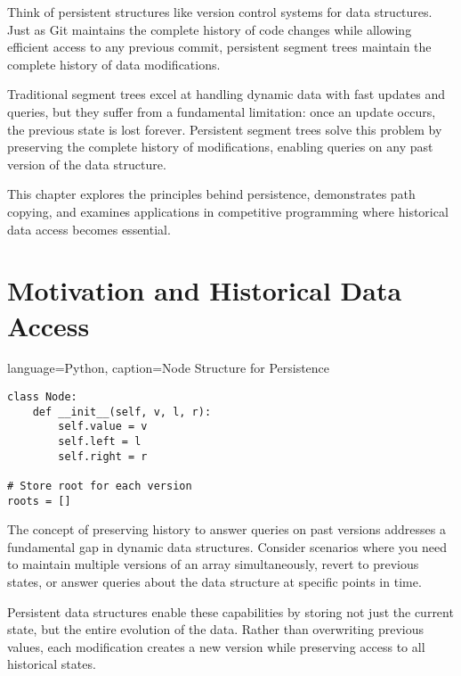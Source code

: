 \label{chap:persistent_segment_trees}

\begin{marginnoteenv}[0pt]{Think of persistent structures like version control systems for data structures. Just as Git maintains the complete history of code changes while allowing efficient access to any previous commit, persistent segment trees maintain the complete history of data modifications.} \end{marginnoteenv}
Traditional segment trees excel at handling dynamic data with fast updates and queries, but they suffer from a fundamental limitation: once an update occurs, the previous state is lost forever. Persistent segment trees solve this problem by preserving the complete history of modifications, enabling queries on any past version of the data structure.

This chapter explores the principles behind persistence, demonstrates path copying, and examines applications in competitive programming where historical data access becomes essential.

\section{Motivation and Historical Data Access}
\label{sec:motivation_use_cases}

\begin{marginlisting}[0pt]{language=Python, caption=Node Structure for Persistence}
\begin{lstlisting}
class Node:
    def __init__(self, v, l, r):
        self.value = v
        self.left = l
        self.right = r

# Store root for each version
roots = []
\end{lstlisting}
\end{marginlisting}

The concept of preserving history to answer queries on past versions addresses a fundamental gap in dynamic data structures. Consider scenarios where you need to maintain multiple versions of an array simultaneously, revert to previous states, or answer queries about the data structure at specific points in time.

Persistent data structures enable these capabilities by storing not just the current state, but the entire evolution of the data. Rather than overwriting previous values, each modification creates a new version while preserving access to all historical states.


